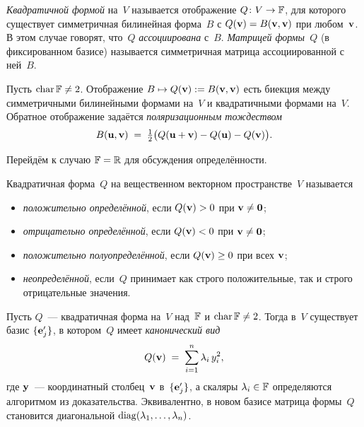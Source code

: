 \begin{definition}
\label{def:quadratic-form}
\emph{Квадратичной формой} на~$V$ называется отображение
$Q \colon V \to \mathbb{F}$, для которого существует симметричная билинейная
форма~$B$ с $Q(\mathbf{v}) = B(\mathbf{v}, \mathbf{v})$ при любом~$\mathbf{v}$.
В этом случае говорят, что~$Q$ \emph{ассоциирована} с~$B$.
\emph{Матрицей формы~$Q$} (в фиксированном базисе) называется
симметричная матрица ассоциированной с ней~$B$.
\end{definition}

\begin{theorem}[Поляризация]
\label{thm:polarization}
Пусть $\operatorname{char} \mathbb{F} \neq 2$. Отображение
$B \mapsto Q(\mathbf{v}) := B(\mathbf{v}, \mathbf{v})$ есть биекция между
симметричными билинейными формами на~$V$ и квадратичными формами
на~$V$. Обратное отображение задаётся \emph{поляризационным
тождеством}
\[
  B(\mathbf{u}, \mathbf{v}) \;=\; \tfrac{1}{2}\bigl(Q(\mathbf{u} + \mathbf{v}) - Q(\mathbf{u}) - Q(\mathbf{v})\bigr).
\]
\end{theorem}

Перейдём к случаю $\mathbb{F} = \mathbb{R}$ для обсуждения определённости.

\begin{definition}
\label{def:definite}
Квадратичная форма~$Q$ на вещественном векторном пространстве~$V$
называется
\begin{itemize}
  \item \emph{положительно определённой}, если $Q(\mathbf{v}) > 0$ при $\mathbf{v} \neq \mathbf{0}$;
  \item \emph{отрицательно определённой}, если $Q(\mathbf{v}) < 0$ при $\mathbf{v} \neq \mathbf{0}$;
  \item \emph{положительно полуопределённой}, если $Q(\mathbf{v}) \ge 0$ при всех $\mathbf{v}$;
  \item \emph{неопределённой}, если~$Q$ принимает как строго положительные, так и строго отрицательные значения.
\end{itemize}
\end{definition}

\begin{theorem}
\label{thm:lagrange-method}
Пусть $Q$~--- квадратичная форма на~$V$ над~$\mathbb{F}$ и
$\operatorname{char} \mathbb{F} \neq 2$. Тогда в~$V$ существует базис
$\{\mathbf{e}'_j\}$, в котором~$Q$ имеет \emph{канонический вид}
\[
  Q(\mathbf{v}) \;=\; \sum_{i=1}^{n} \lambda_i\, y_i^{2},
\]
где $\mathbf{y}$~--- координатный столбец~$\mathbf{v}$ в~$\{\mathbf{e}'_j\}$,
а скаляры $\lambda_i \in \mathbb{F}$ определяются алгоритмом из доказательства.
Эквивалентно, в новом базисе матрица формы~$Q$ становится диагональной
$\operatorname{diag}(\lambda_1, \dots, \lambda_n)$.
\end{theorem}

